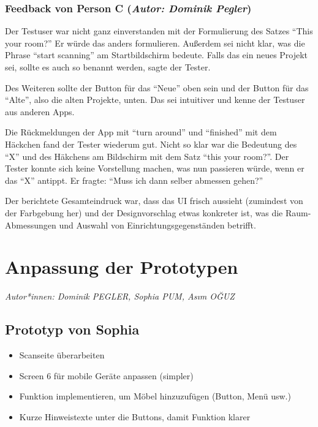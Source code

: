 \documentclass[12pt,paper=a4,oneside,hidelinks,headings=small,captions=heading,captions=nooneline]{scrartcl}
\begin{document}
\subsubsection{\textbf{Feedback von Person C} (\emph{Autor: Dominik Pegler})}
\label{sec:org91059cb}

Der Testuser war nicht ganz einverstanden mit der Formulierung des
Satzes "`This your room?"' Er würde das anders formulieren. Außerdem sei
nicht klar, was die Phrase "`start scanning"' am Startbildschirm
bedeute. Falls das ein neues Projekt sei, sollte es auch so benannt
werden, sagte der Tester.

Des Weiteren sollte der Button für das "`Neue"' oben sein und der Button
für das "`Alte"', also die alten Projekte, unten. Das sei intuitiver und
kenne der Testuser aus anderen Apps.

Die Rückmeldungen der App mit "`turn around"' und "`finished"' mit dem
Häckchen fand der Tester wiederum gut. Nicht so klar war die Bedeutung
des "`X"' und des Häkchens am Bildschirm mit dem Satz "`this your
room?"'. Der Tester konnte sich keine Vorstellung machen, was nun
passieren würde, wenn er das "`X"' antippt. Er fragte: "`Muss ich dann
selber abmessen gehen?"'

Der berichtete Gesamteindruck war, dass das UI frisch aussieht
(zumindest von der Farbgebung her) und der Designvorschlag etwas
konkreter ist, was die Raum-Abmessungen und Auswahl von
Einrichtungsgegenständen betrifft.

\section{Anpassung der Prototypen}
\label{sec:orgffb7cb0}
\emph{Autor*innen: Dominik PEGLER, Sophia PUM, Asım OĞUZ}
\subsection{Prototyp von Sophia}
\label{sec:org3833639}
\begin{itemize}
\item Scanseite überarbeiten
\item Screen 6 für mobile Geräte anpassen (simpler)
\item Funktion implementieren, um Möbel hinzuzufügen (Button, Menü usw.)
\item Kurze Hinweistexte unter die Buttons, damit Funktion klarer
\end{itemize}
\end{document}
